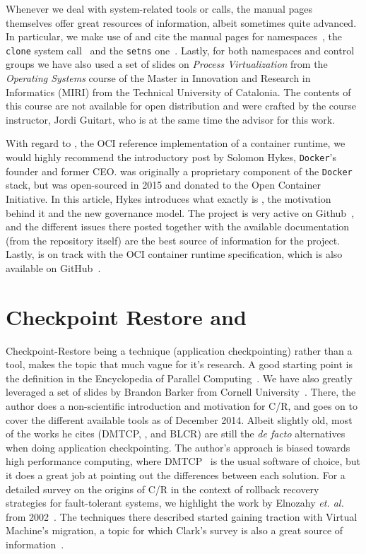 Whenever we deal with system-related tools or calls, the manual pages themselves offer great resources of information, albeit sometimes quite advanced.
In particular, we make use of and cite the manual pages for namespaces~\cite{namespaces-manual}, the \texttt{clone} system call~\cite{clone-manual} and the \texttt{setns} one~\cite{setns-manual}.
Lastly, for both namespaces and control groups we have also used a set of slides on \textit{Process Virtualization} from the \textit{Operating Systems} course of the Master in Innovation and Research in Informatics (MIRI) from the Technical University of Catalonia.
The contents of this course are not available for open distribution and were crafted by the course instructor, Jordi Guitart, who is at the same time the advisor for this work.

With regard to \runc, the OCI reference implementation of a container runtime, we would highly recommend the introductory post by Solomon Hykes, \texttt{Docker}'s founder and former CEO.
\runc was originally a proprietary component of the \texttt{Docker} stack, but was open-sourced in 2015 and donated to the Open Container Initiative.
In this article, Hykes introduces what exactly is \runc, the motivation behind it and the new governance model.
The project is very active on Github~\cite{runc-memtrack}, and the different issues there posted together with the available documentation (from the repository itself) are the best source of information for the project.
Lastly, \runc is on track  with the OCI container runtime specification, which is also available on GitHub~\cite{runc-spec}.

\section{Checkpoint Restore and \criu}

Checkpoint-Restore being a technique (application checkpointing) rather than a tool, makes the topic that much vague for it's research.
A good starting point is the definition in the Encyclopedia of Parallel Computing~\cite{Schulz2011}.
We have also greatly leveraged a set of slides by Brandon Barker from Cornell University~\cite{Barker2014}.
There, the author does a non-scientific introduction and motivation for C/R, and goes on to cover the different available tools as of December 2014.
Albeit slightly old, most of the works he cites (DMTCP, \criu, and BLCR) are still the \textit{de facto} alternatives when doing application checkpointing.
The author's approach is biased towards high performance computing, where DMTCP~\cite{dmtcp} is the usual software of choice, but it does a great job at pointing out the differences between each solution.
For a detailed survey on the origins of C/R in the context of rollback recovery strategies for fault-tolerant systems, we highlight the work by Elnozahy \textit{et. al.} from 2002~\cite{Elnozahy2002}.
The techniques there described started gaining traction with Virtual Machine's migration, a topic for which Clark's survey is also a great source of information~\cite{Clark2005}.

